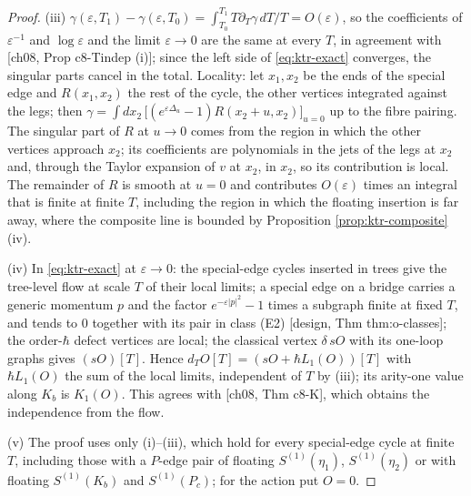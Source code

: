 \begin{proof}
(iii) $\gamma(\varepsilon,T_1)-\gamma(\varepsilon,T_0)=\int_{T_0}^{T_1}T\partial_T\gamma\,dT/T=O(\varepsilon)$, so the coefficients of $\varepsilon^{-1}$ and $\log\varepsilon$ and the limit $\varepsilon\to0$ are the same at every $T$, in agreement with [ch08, Prop c8-Tindep (i)]; since the left side of \eqref{eq:ktr-exact} converges, the singular parts cancel in the total. Locality: let $x_1,x_2$ be the ends of the special edge and $R(x_1,x_2)$ the rest of the cycle, the other vertices integrated against the legs; then $\gamma=\int dx_2\,\big[(e^{\varepsilon\Delta_u}-1)R(x_2+u,x_2)\big]_{u=0}$ up to the fibre pairing. The singular part of $R$ at $u\to0$ comes from the region in which the other vertices approach $x_2$; its coefficients are polynomials in the jets of the legs at $x_2$ and, through the Taylor expansion of $v$ at $x_2$, in $x_2$, so its contribution is local. The remainder of $R$ is smooth at $u=0$ and contributes $O(\varepsilon)$ times an integral that is finite at finite $T$, including the region in which the floating insertion is far away, where the composite line is bounded by Proposition \ref{prop:ktr-composite} (iv).

(iv) In \eqref{eq:ktr-exact} at $\varepsilon\to0$: the special-edge cycles inserted in trees give the tree-level flow at scale $T$ of their local limits; a special edge on a bridge carries a generic momentum $p$ and the factor $e^{-\varepsilon|p|^2}-1$ times a subgraph finite at fixed $T$, and tends to $0$ together with its pair in class (E2) [design, Thm thm:o-classes]; the order-$\hbar$ defect vertices are local; the classical vertex $\delta\,sO$ with its one-loop graphs gives $(sO)[T]$. Hence $d_TO[T]=(sO+\hbar L_1(O))[T]$ with $\hbar L_1(O)$ the sum of the local limits, independent of $T$ by (iii); its arity-one value along $K_b$ is $K_1(O)$. This agrees with [ch08, Thm c8-K], which obtains the independence from the flow.

(v) The proof uses only (i)--(iii), which hold for every special-edge cycle at finite $T$, including those with a $P$-edge pair of floating $S^{(1)}(\eta_1)$, $S^{(1)}(\eta_2)$ or with floating $S^{(1)}(K_b)$ and $S^{(1)}(P_c)$; for the action put $O=0$.
\end{proof}

